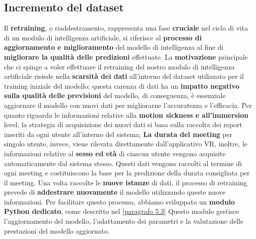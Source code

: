 \subsection{Incremento del dataset}
\fancyhead{}    %
\label{paragrafo 2.3}
\par{
Il \textbf{retraining}, o riaddestramento, rappresenta una fase \textbf{cruciale} nel ciclo di vita di un modulo di intelligenza artificiale, si riferisce al \textbf{processo di aggiornamento e miglioramento} del modello di intelligenza al fine di \textbf{migliorare la qualità delle predizioni} effettuate.
\newline
La \textbf{motivazione} principale che ci spinge a voler effettuare il retraining del nostro modulo di intelligenza artificiale risiede nella \textbf{scarsità dei dati} all'interno del dataset utilizzato per il training iniziale del modello; questa carenza di dati ha un \textbf{impatto negativo sulla qualità delle previsioni} del modello, di conseguenza, è essenziale aggiornare il modello con nuovi dati per migliorarne l'accuratezza e l'efficacia.
\newline
\newline
Per quanto riguarda le informazioni relative alla \textbf{motion sickness e all'immersion} level, la strategia di acquisizione dei nuovi dati si basa sulla raccolta dei report inseriti da ogni utente all'interno del sistema; 
\textbf{La durata del meeting} per singolo utente, invece, viene rilevata direttamente dall'applicativo VR, inoltre, le informazioni relative al \textbf{sesso ed età} di ciascun utente vengono acquisite automaticamente dal sistema stesso.
\newline
\newline
Questi dati vengono raccolti al termine di ogni meeting e costituiscono la base per la predizione della durata consigliata per il meeting.
\newline
\newline
Una volta raccolte le \textbf{nuove istanze} di dati, il processo di retraining prevede di \textbf{addestrare nuovamente} il modello utilizzando queste nuove informazioni. Per facilitare questo processo, abbiamo sviluppato un \textbf{modulo Python dedicato}, come descritto nel \ref{paragrafo 5.3} \newline
Questo modulo gestisce l'aggiornamento del modello, l'adattamento dei parametri e la valutazione delle prestazioni del modello aggiornato.
\newline
}